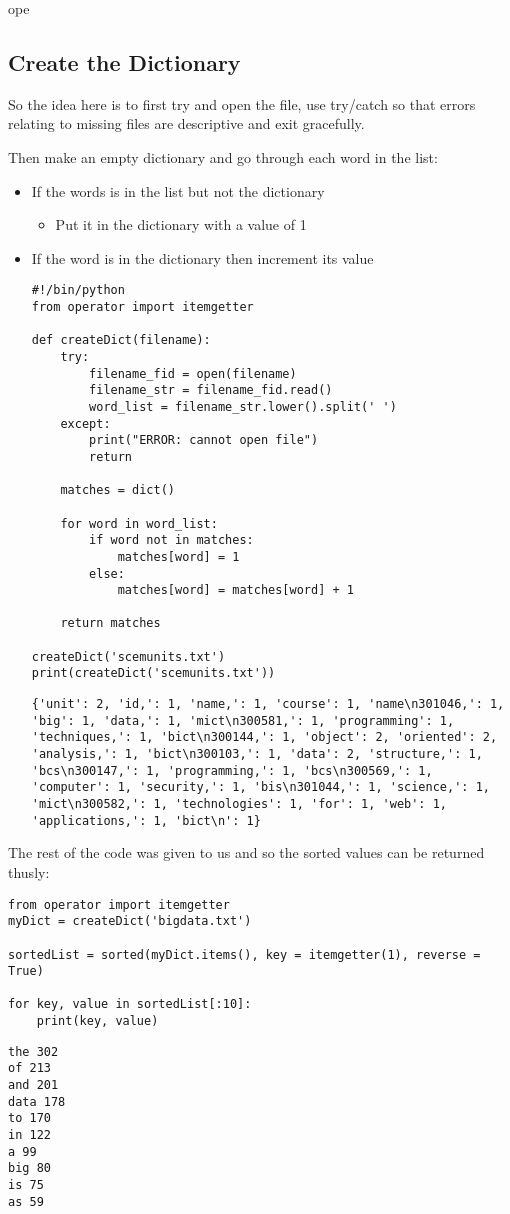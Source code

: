 \documentclass[11pt]{article}
\begin{document}
ope

\subsection{Create the Dictionary}
\label{sec:org2014149}
So the idea here is to first try and open the file, use try/catch so that errors relating to missing files are descriptive and exit gracefully.

Then make an empty dictionary and go through each word in the list:
\begin{itemize}
\item If the words is in the list but not the dictionary
\begin{itemize}
\item Put it in the dictionary with a value of 1
\end{itemize}
\item If the word is in the dictionary then increment its value

\begin{verbatim}
#!/bin/python
from operator import itemgetter

def createDict(filename):
    try:
        filename_fid = open(filename)
        filename_str = filename_fid.read()
        word_list = filename_str.lower().split(' ')
    except:
        print("ERROR: cannot open file")
        return

    matches = dict()

    for word in word_list:
        if word not in matches:
            matches[word] = 1
        else:
            matches[word] = matches[word] + 1

    return matches

createDict('scemunits.txt')
print(createDict('scemunits.txt'))
\end{verbatim}

\begin{verbatim}
{'unit': 2, 'id,': 1, 'name,': 1, 'course': 1, 'name\n301046,': 1, 'big': 1, 'data,': 1, 'mict\n300581,': 1, 'programming': 1, 'techniques,': 1, 'bict\n300144,': 1, 'object': 2, 'oriented': 2, 'analysis,': 1, 'bict\n300103,': 1, 'data': 2, 'structure,': 1, 'bcs\n300147,': 1, 'programming,': 1, 'bcs\n300569,': 1, 'computer': 1, 'security,': 1, 'bis\n301044,': 1, 'science,': 1, 'mict\n300582,': 1, 'technologies': 1, 'for': 1, 'web': 1, 'applications,': 1, 'bict\n': 1}
\end{verbatim}
\end{itemize}

The rest of the code was given to us and so the sorted values can be returned thusly:

\begin{verbatim}
from operator import itemgetter
myDict = createDict('bigdata.txt')

sortedList = sorted(myDict.items(), key = itemgetter(1), reverse = True)

for key, value in sortedList[:10]:
    print(key, value)

\end{verbatim}

\begin{verbatim}
the 302
of 213
and 201
data 178
to 170
in 122
a 99
big 80
is 75
as 59
\end{verbatim}
\end{document}
